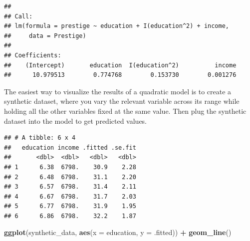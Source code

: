 \documentclass[
  12pt,
  oneside,openany]{book}
\newenvironment{Shaded}{\begin{snugshade}}{\end{snugshade}}
\newcommand{\DataTypeTok}[1]{\textcolor[rgb]{0.13,0.29,0.53}{#1}}
\newcommand{\DecValTok}[1]{\textcolor[rgb]{0.00,0.00,0.81}{#1}}
\newcommand{\KeywordTok}[1]{\textcolor[rgb]{0.13,0.29,0.53}{\textbf{#1}}}
\newcommand{\NormalTok}[1]{#1}
\newcommand{\OperatorTok}[1]{\textcolor[rgb]{0.81,0.36,0.00}{\textbf{#1}}}
\newcommand{\StringTok}[1]{\textcolor[rgb]{0.31,0.60,0.02}{#1}}
\begin{document}
\begin{verbatim}
## 
## Call:
## lm(formula = prestige ~ education + I(education^2) + income, 
##     data = Prestige)
## 
## Coefficients:
##    (Intercept)       education  I(education^2)          income  
##      10.979513        0.774768        0.153730        0.001276
\end{verbatim}

The easiest way to visualize the results of a quadratic model is to create a synthetic dataset, where you vary the relevant variable across its range while holding all the other variables fixed at the same value. Then plug the synthetic dataset into the model to get predicted values.

\begin{Shaded}
\end{Shaded}

\begin{verbatim}
## # A tibble: 6 x 4
##   education income .fitted .se.fit
##       <dbl>  <dbl>   <dbl>   <dbl>
## 1      6.38  6798.    30.9    2.28
## 2      6.48  6798.    31.1    2.20
## 3      6.57  6798.    31.4    2.11
## 4      6.67  6798.    31.7    2.03
## 5      6.77  6798.    31.9    1.95
## 6      6.86  6798.    32.2    1.87
\end{verbatim}

\begin{Shaded}
\begin{Highlighting}[]
\KeywordTok{ggplot}\NormalTok{(synthetic\_data, }\KeywordTok{aes}\NormalTok{(}\DataTypeTok{x =}\NormalTok{ education, }\DataTypeTok{y =}\NormalTok{ .fitted)) }\OperatorTok{+}
\StringTok{    }\KeywordTok{geom\_line}\NormalTok{()}
\end{Highlighting}
\end{Shaded}
\end{document}
